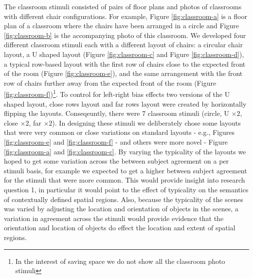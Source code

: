 \documentclass[11pt,letterpaper]{article}
\begin{document}
The classroom stimuli consisted of pairs of floor plans and photos of classrooms with different chair configurations. For example, Figure \ref{fig:classroom-a} is a floor plan of a classroom where the chairs have been arranged in a circle and Figure \ref{fig:classroom-b} is the accompanying photo of this classroom. We developed four different classroom stimuli each with a different layout of chairs: a circular chair layout, a U shaped layout (Figure \ref{fig:classroom-c} and Figure \ref{fig:classroom-d}), a typical row-based layout with the first row of chairs close to the expected front of the room (Figure \ref{fig:classroom-e}), and the same arrangement with the front row of chairs further away from the expected front of the room (Figure \ref{fig:classroom-f})\footnote{In the interest of saving space we do not show all the classroom photo stimuli}. To control for left-right bias effects two versions of the U shaped layout, close rows layout and far rows layout were created by horizontally flipping the layouts. Conseqeuntly, there were 7 classroom stimuli (circle, U $\times 2$, close $\times 2$, far $\times 2$). In designing these stimuli we deliberately chose some layouts that were very common or close variations on standard layouts - e.g., Figures \ref{fig:classroom-e} and \ref{fig:classroom-f} - and others were more novel - Figure \ref{fig:classroom-a} and \ref{fig:classroom-c}. By varying the typicality of the layouts we hoped to get some variation across the between subject agreement on a per stimuli basis, for example we expected to get a higher between subject agreement for the stimuli that were more common. This would provide insight into research question 1, in particular it would point to the effect of typicality on the semantics of contextually defined spatial regions. Also, because the typicality of the scenes was varied by adjusting the location and orientation of objects in the scenes, a variation in agreement across the stimuli would provide evidence that the orientation and location of objects do effect the location and extent of spatial regions.
\end{document}
